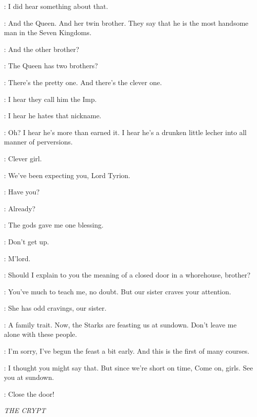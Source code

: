 \TYRION: I did hear something about that. 

\ROS: And the Queen. And her twin brother. They say that he is the most handsome man in the Seven Kingdoms. 

\TYRION: And the other brother? 

\ROS: The Queen has two brothers? 

\TYRION: There's the pretty one. And there's the clever one. 

\ROS: I hear they call him the Imp. 

\TYRION: I hear he hates that nickname. 

\ROS: Oh? I hear he's more than earned it. I hear he's a drunken little lecher into all manner of perversions. 

\TYRION: Clever girl. 

\ROS: We've been expecting you, Lord Tyrion. 

\TYRION: Have you? 

\ROS:  Already?

\TYRION: The gods gave me one blessing. 


\JAIME: Don't get up. 

\ROS: M'lord. 

\TYRION: Should I explain to you the meaning of a closed door in a whorehouse, brother? 

\JAIME: You've much to teach me, no doubt. But our sister craves your attention. 

\TYRION: She has odd cravings, our sister. 

\JAIME: A family trait. Now, the Starks are feasting us at sundown. Don't leave me alone with these people. 

\TYRION: I'm sorry, I've begun the feast a bit early. And this is the first of many courses. 

\JAIME: I thought you might say that. But since we're short on time,  Come on, girls. See you at sundown. 


\TYRION: Close the door! 


\scene

\textit{THE CRYPT} 


